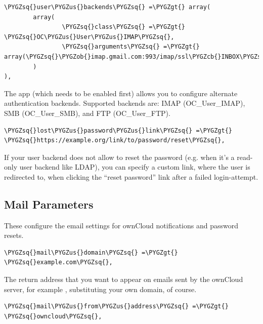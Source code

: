 \documentclass[letterpaper,10pt,english]{sphinxmanual}
\def\PYGZus{\char`\_}
\def\PYGZob{\char`\{}
\def\PYGZcb{\char`\}}
\def\PYGZgt{\char`\>}
\def\PYGZsq{\char`\'}
\begin{document}
\begin{Verbatim}[commandchars=\\\{\}]
\PYGZsq{}user\PYGZus{}backends\PYGZsq{} =\PYGZgt{} array(
        array(
                \PYGZsq{}class\PYGZsq{} =\PYGZgt{} \PYGZsq{}OC\PYGZus{}User\PYGZus{}IMAP\PYGZsq{},
                \PYGZsq{}arguments\PYGZsq{} =\PYGZgt{} array(\PYGZsq{}\PYGZob{}imap.gmail.com:993/imap/ssl\PYGZcb{}INBOX\PYGZsq{})
        )
),
\end{Verbatim}

The  app (which needs to be enabled first) allows you to
configure alternate authentication backends. Supported backends are:
IMAP (OC\_User\_IMAP), SMB (OC\_User\_SMB), and FTP (OC\_User\_FTP).

\begin{Verbatim}[commandchars=\\\{\}]
\PYGZsq{}lost\PYGZus{}password\PYGZus{}link\PYGZsq{} =\PYGZgt{} \PYGZsq{}https://example.org/link/to/password/reset\PYGZsq{},
\end{Verbatim}

If your user backend does not allow to reset the password (e.g. when it's a
read-only user backend like LDAP), you can specify a custom link, where the
user is redirected to, when clicking the ``reset password'' link after a failed
login-attempt.


\subsection{Mail Parameters}
\label{configuration_server/config_sample_php_parameters:mail-parameters}
These configure the email settings for ownCloud notifications and password
resets.

\begin{Verbatim}[commandchars=\\\{\}]
\PYGZsq{}mail\PYGZus{}domain\PYGZsq{} =\PYGZgt{} \PYGZsq{}example.com\PYGZsq{},
\end{Verbatim}

The return address that you want to appear on emails sent by the ownCloud
server, for example , substituting your own domain,
of course.

\begin{Verbatim}[commandchars=\\\{\}]
\PYGZsq{}mail\PYGZus{}from\PYGZus{}address\PYGZsq{} =\PYGZgt{} \PYGZsq{}owncloud\PYGZsq{},
\end{Verbatim}
\end{document}
